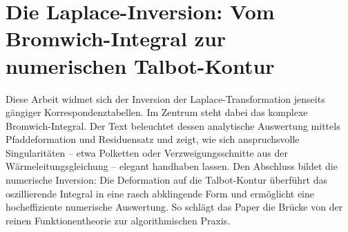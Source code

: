 %
%
%
%
\chapter{Die Laplace-Inversion: Vom Bromwich-Integral zur numerischen Talbot-Kontur \label{chapter:laplace}}
\begin{refsection}

Diese Arbeit widmet sich der Inversion der Laplace-Transformation jenseits gängiger Korrespondenztabellen. 
Im Zentrum steht dabei das komplexe Bromwich-Integral. 
Der Text beleuchtet dessen analytische Auswertung mittels Pfaddeformation und Residuensatz und zeigt, wie sich anspruchsvolle Singularitäten -- etwa Polketten oder Verzweigungsschnitte aus der Wärmeleitungsgleichung -- elegant handhaben lassen. 
Den Abschluss bildet die numerische Inversion: Die Deformation auf die Talbot-Kontur überführt das oszillierende Integral in eine rasch abklingende Form und ermöglicht eine hocheffiziente numerische Auswertung. 
So schlägt das Paper die Brücke von der reinen Funktionentheorie zur algorithmischen Praxis.









\printbibliography[heading=subbibliography]
\end{refsection}
